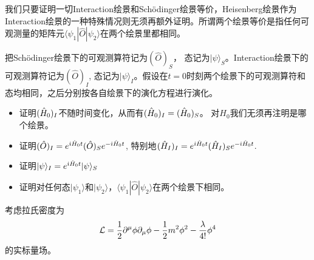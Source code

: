 \documentclass[CJK]{beamer}
\begin{document}
\begin{frame} 
\bch
{\small 
我们只要证明一切Interaction绘景和Sch\"odinger绘景等价，Heisenberg绘景作为Interaction绘景的一种特殊情况则无须再额外证明。所谓两个绘景等价是指任何可观测量的矩阵元$\langle \psi_1 | \hat{O}|\psi_2\rangle$在两个绘景里都相同。
\skipline

把Sch\"odinger绘景下的可观测算符记为$(\hat{O})_S$， 态记为$|\psi\rangle_S$。Interaction绘景下的可观测算符记为$(\hat{O})_I$, 态记为$|\psi\rangle_I$。假设在$t=0$时刻两个绘景下的可观测算符和态均相同，之后分别按各自绘景下的演化方程进行演化。
\begin{itemize}
\item{证明$({\hat{H}}_0)_I$不随时间变化，从而有$({\hat{H}}_0)_I=({\hat{H}}_0)_S$。 对$H_0$我们无须再注明是哪个绘景。}
\item{证明$(\hat{O})_I = e^{{\dot{\imath}}{\hat{H}}_0 t}(\hat{O})_S e^{-{\dot{\imath}}{\hat{H}}_0 t}$, 特别地$({\hat{H}}_I)_I= e^{{\dot{\imath}}{\hat{H}}_0 t}({\hat{H}}_I)_S e^{-{\dot{\imath}}{\hat{H}}_0 t}$.}
\item{证明$|\psi\rangle_I = e^{{\dot{\imath}}{\hat{H}}_0 t} |\psi\rangle_S $}
\item{证明对任何态$|\psi_1\rangle$和$|\psi_2\rangle$，$\langle \psi_1 | \hat{O}|\psi_2\rangle$在两个绘景下相同。}
\end{itemize}
}
\ech
\end{frame}

\begin{frame} 
\bch
考虑拉氏密度为
$${\mathcal{L}} = \frac{1}{2}\partial^\mu\phi\partial_\mu\phi - \frac{1}{2}m^2\phi^2 - \frac{\lambda}{4!}\phi^4$$
的实标量场。
 
\ech
\end{frame}

\begin{frame} 
\chtitle{} 
\bch

\ech
\end{frame}

\begin{frame} 
\chtitle{} 
\bch

\ech
\end{frame}
\end{document}
